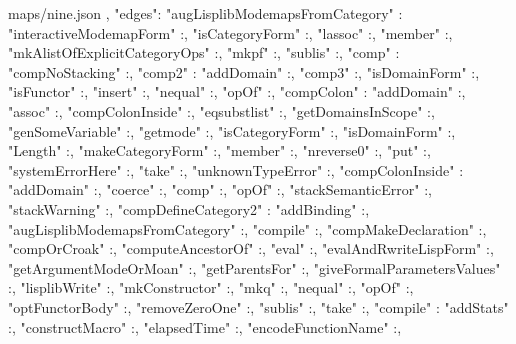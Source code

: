\documentclass{article}
\begin{document}
\begin{chunk}{maps/nine.json}
{{},
 "edges":
 {
"augLisplibModemapsFromCategory" :{
  "interactiveModemapForm"         :{},
  "isCategoryForm"                 :{},
  "lassoc"                         :{},
  "member"                         :{},
  "mkAlistOfExplicitCategoryOps"   :{},
  "mkpf"                           :{},
  "sublis"                         :{}},
"comp" :{
  "compNoStacking"                 :{}},
"comp2" :{
  "addDomain"                      :{},
  "comp3"                          :{},
  "isDomainForm"                   :{},
  "isFunctor"                      :{},
  "insert"                         :{},
  "nequal"                         :{},
  "opOf"                           :{}},
"compColon" :{
  "addDomain"                      :{},
  "assoc"                          :{},
  "compColonInside"                :{},
  "eqsubstlist"                    :{},
  "getDomainsInScope"              :{},
  "genSomeVariable"                :{},
  "getmode"                        :{},
  "isCategoryForm"                 :{},
  "isDomainForm"                   :{},
  "Length"                         :{},
  "makeCategoryForm"               :{},
  "member"                         :{},
  "nreverse0"                      :{},
  "put"                            :{},
  "systemErrorHere"                :{},
  "take"                           :{},
  "unknownTypeError"               :{}},
"compColonInside" :{
  "addDomain"                      :{},
  "coerce"                         :{},
  "comp"                           :{},
  "opOf"                           :{},
  "stackSemanticError"             :{},
  "stackWarning"                   :{}},
"compDefineCategory2" :{
  "addBinding"                     :{},
  "augLisplibModemapsFromCategory" :{},
  "compile"                        :{},
  "compMakeDeclaration"            :{},
  "compOrCroak"                    :{},
  "computeAncestorOf"              :{},
  "eval"                           :{},
  "evalAndRwriteLispForm"          :{},
  "getArgumentModeOrMoan"          :{},
  "getParentsFor"                  :{},
  "giveFormalParametersValues"     :{},
  "lisplibWrite"                   :{},
  "mkConstructor"                  :{},
  "mkq"                            :{},
  "nequal"                         :{},
  "opOf"                           :{},
  "optFunctorBody"                 :{},
  "removeZeroOne"                  :{},
  "sublis"                         :{},
  "take"                           :{}},
"compile" :{
  "addStats"                   :{},
  "constructMacro"             :{},
  "elapsedTime"                :{},
  "encodeFunctionName"         :{},
}}}
\end{chunk}
\end{document}

